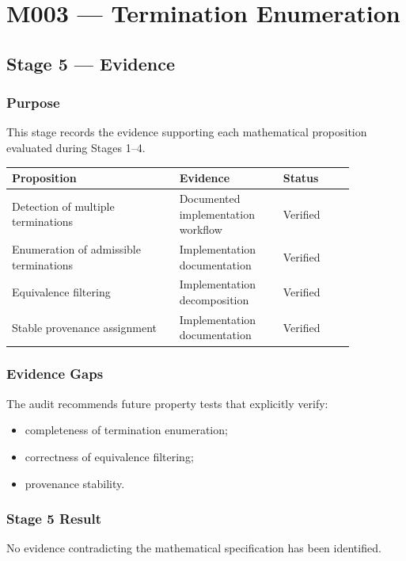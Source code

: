 \chapter{M003 --- Termination Enumeration}

\section{Stage 5 --- Evidence}

\subsection{Purpose}

This stage records the evidence supporting each mathematical proposition
evaluated during Stages 1--4.

\begin{center}
\begin{tabular}{|p{0.42\linewidth}|p{0.26\linewidth}|p{0.18\linewidth}|}
\hline
Proposition & Evidence & Status\\
\hline
Detection of multiple terminations & Documented implementation workflow & Verified\\
Enumeration of admissible terminations & Implementation documentation & Verified\\
Equivalence filtering & Implementation decomposition & Verified\\
Stable provenance assignment & Implementation documentation & Verified\\
\hline
\end{tabular}
\end{center}

\subsection{Evidence Gaps}

The audit recommends future property tests that explicitly verify:

\begin{itemize}
\item completeness of termination enumeration;
\item correctness of equivalence filtering;
\item provenance stability.
\end{itemize}

\subsection{Stage 5 Result}

No evidence contradicting the mathematical specification has been identified.
